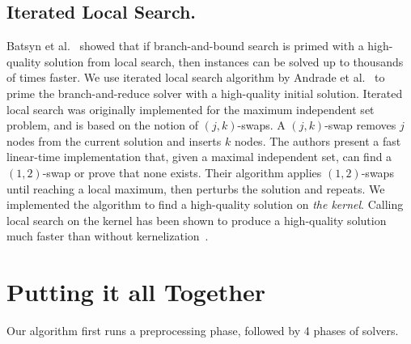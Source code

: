 \documentclass[twoside,leqno,twocolumn]{article}
\begin{document}
\subsection{Iterated Local Search.}
Batsyn et al.~\cite{batsyn-mcs-ils-2014} showed that if branch-and-bound search is primed with a high-quality solution from local search, then instances can be solved up to thousands of times faster. 
We use iterated local search algorithm by Andrade et al.~\cite{andrade-2012} to prime the branch-and-reduce solver with a high-quality initial solution. Iterated local search was originally implemented for the maximum independent set problem, and is based on the notion of $(j,k)$-swaps. A $(j,k)$-swap removes $j$ nodes from the current solution and inserts $k$ nodes. The authors present a fast linear-time implementation that, given a maximal independent set, can find a $(1,2)$-swap or prove that none exists. Their algorithm applies $(1,2)$-swaps until reaching a local maximum, then perturbs the solution and repeats. We implemented the algorithm to find a high-quality solution on \emph{the kernel}. Calling local search on the kernel has been shown to produce a high-quality solution much faster than without kernelization~\cite{chang2017computing,dahlum2016accelerating}.

\section{Putting it all Together}
Our algorithm first runs a preprocessing phase, followed by 4 phases of solvers.


%
\end{document}
